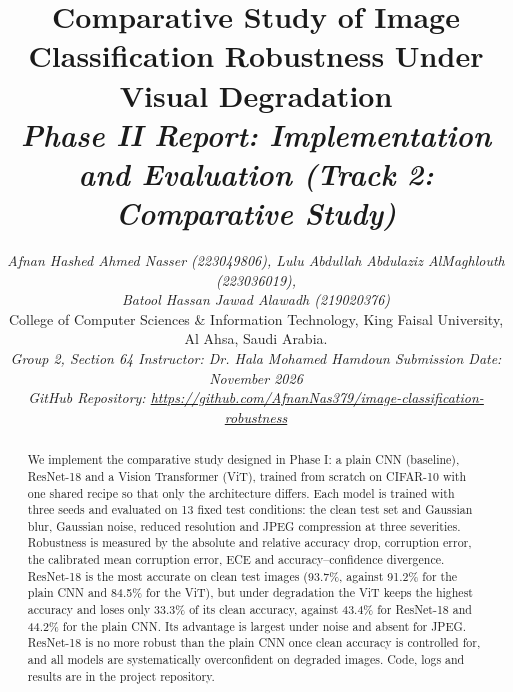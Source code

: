 \documentclass[conference]{IEEEtran}
\begin{document}
\title{Comparative Study of Image Classification Robustness Under Visual Degradation\\[2pt]
{\large\itshape Phase II Report: Implementation and Evaluation (Track 2: Comparative Study)}}

\author{%
\textit{Afnan Hashed Ahmed Nasser (223049806), Lulu Abdullah Abdulaziz AlMaghlouth (223036019),}\\
\textit{Batool Hassan Jawad Alawadh (219020376)}\\
College of Computer Sciences \& Information Technology, King Faisal University, Al Ahsa, Saudi Arabia.\\
\textit{Group 2, Section 64 \enspace\textbar\enspace Instructor: Dr. Hala Mohamed Hamdoun \enspace\textbar\enspace Submission Date: November 2026}\\
\textit{GitHub Repository: \url{https://github.com/AfnanNas379/image-classification-robustness}}%
}

\maketitle

\begin{abstract}
We implement the comparative study designed in Phase I: a plain CNN (baseline), ResNet-18 and a Vision Transformer (ViT), trained from scratch on CIFAR-10 with one shared recipe so that only the architecture differs. Each model is trained with three seeds and evaluated on 13 fixed test conditions: the clean test set and Gaussian blur, Gaussian noise, reduced resolution and JPEG compression at three severities. Robustness is measured by the absolute and relative accuracy drop, corruption error, the calibrated mean corruption error, ECE and accuracy--confidence divergence. ResNet-18 is the most accurate on clean test images (93.7\%, against 91.2\% for the plain CNN and 84.5\% for the ViT), but under degradation the ViT keeps the highest accuracy and loses only 33.3\% of its clean accuracy, against 43.4\% for ResNet-18 and 44.2\% for the plain CNN. Its advantage is largest under noise and absent for JPEG. ResNet-18 is no more robust than the plain CNN once clean accuracy is controlled for, and all models are systematically overconfident on degraded images. Code, logs and results are in the project repository.
\end{abstract}
\end{document}
